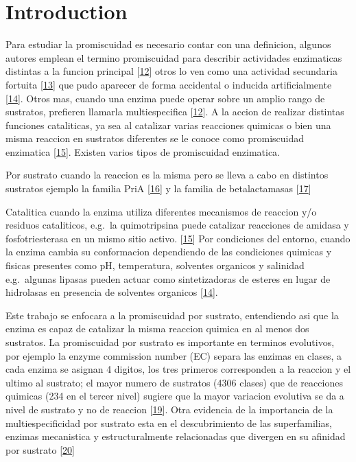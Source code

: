 \documentclass[12pt,twoside]{reedthesis}
\begin{document}
  \section{Introduction}\label{introduction-1}
  
  Para estudiar la promiscuidad es necesario contar con una definicion,
  algunos autores emplean el termino promiscuidad para describir
  actividades enzimaticas distintas a la funcion principal
  {[}\protect\hyperlink{ref-khersonsky_enzyme_2010}{12}{]} otros lo ven
  como una actividad secundaria fortuita
  {[}\protect\hyperlink{ref-copley_enzymes_2003}{13}{]} que pudo aparecer
  de forma accidental o inducida artificialmente
  {[}\protect\hyperlink{ref-hult_enzyme_2007}{14}{]}. Otros mas, cuando
  una enzima puede operar sobre un amplio rango de sustratos, prefieren
  llamarla multiespecifica
  {[}\protect\hyperlink{ref-khersonsky_enzyme_2010}{12}{]}. A la accion de
  realizar distintas funciones cataliticas, ya sea al catalizar varias
  reacciones quimicas o bien una misma reaccion en sustratos diferentes se
  le conoce como promiscuidad enzimatica
  {[}\protect\hyperlink{ref-obrien_catalytic_1999}{15}{]}. Existen varios
  tipos de promiscuidad enzimatica.
  
  Por sustrato cuando la reaccion es la misma pero se lleva a cabo en
  distintos sustratos ejemplo la familia PriA
  {[}\protect\hyperlink{ref-baronagomez_occurrence_2003}{16}{]} y la
  familia de betalactamasas
  {[}\protect\hyperlink{ref-risso_phenotypic_2014}{17}{]}
  
  Catalitica cuando la enzima utiliza diferentes mecanismos de reaccion
  y/o residuos cataliticos, e.g.~la quimotripsina puede catalizar
  reacciones de amidasa y fosfotriesterasa en un mismo sitio activo.
  {[}\protect\hyperlink{ref-obrien_catalytic_1999}{15}{]} Por condiciones
  del entorno, cuando la enzima cambia su conformacion dependiendo de las
  condiciones quimicas y fisicas presentes como pH, temperatura, solventes
  organicos y salinidad e.g.~algunas lipasas pueden actuar como
  sintetizadoras de esteres en lugar de hidrolasas en presencia de
  solventes organicos {[}\protect\hyperlink{ref-hult_enzyme_2007}{14}{]}.
  
  Este trabajo se enfocara a la promiscuidad por sustrato, entendiendo asi
  que la enzima es capaz de catalizar la misma reaccion quimica en al
  menos dos sustratos. La promiscuidad por sustrato es importante en
  terminos evolutivos, por ejemplo la enzyme commission number (EC) separa
  las enzimas en clases, a cada enzima se asignan 4 digitos, los tres
  primeros corresponden a la reaccion y el ultimo al sustrato; el mayor
  numero de sustratos (4306 clases) que de reacciones quimicas (234 en el
  tercer nivel) sugiere que la mayor variacion evolutiva se da a nivel de
  sustrato y no de reaccion
  {[}\protect\hyperlink{ref-li_computational_2004}{19}{]}. Otra evidencia
  de la importancia de la multiespecificidad por sustrato esta en el
  descubrimiento de las superfamilias, enzimas mecanistica y
  estructuralmente relacionadas que divergen en su afinidad por sustrato
  {[}\protect\hyperlink{ref-glasner_evolution_2006}{20}{]}
  
\end{document}

